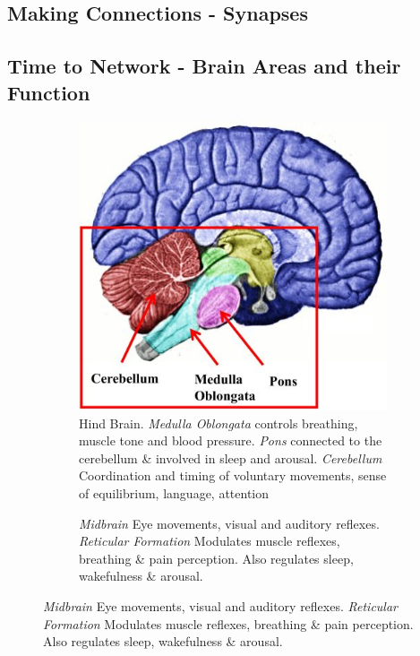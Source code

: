 \documentclass[]{article}
\begin{document}
\subsection{Making Connections - Synapses}

\subsection{Time to Network - Brain Areas and their Function}

\begin{figure}[H]
	\caption{Brain Regions}
	\begin{subfigure}[b]{0.45\textwidth}
		\caption{Hind Brain. \emph{Medulla Oblongata} controls breathing, muscle tone and blood pressure.
			\emph{Pons} connected to the cerebellum \& involved in sleep and arousal.
			\emph{Cerebellum} Coordination and timing of voluntary movements, sense of equilibrium, language, attention}
		\includegraphics[width=\textwidth]{hindbrain}
	\end{subfigure}
	\begin{subfigure}[b]{0.45\textwidth}
		\caption{\emph{Midbrain} Eye movements, visual and auditory reflexes.
			\emph{Reticular Formation} 	Modulates muscle reflexes, breathing \& pain perception. Also regulates sleep, 			wakefulness \& 	arousal.}

\end{subfigure}
\end{figure}
\end{document}
